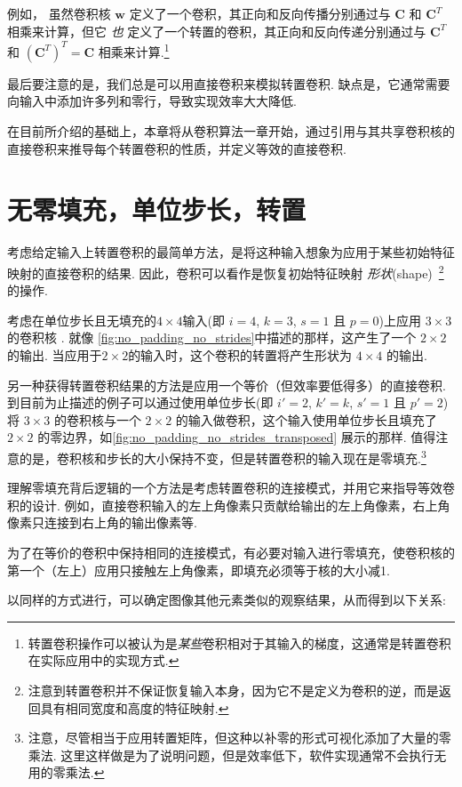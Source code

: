 \documentclass[notitlepage]{ctexrep}
\begin{document}
例如， 虽然卷积核 $\mathbf{w}$ 定义了一个卷积，其正向和反向传播分别通过与 $\mathbf{C}$ 和 $\mathbf{C}^T$ 相乘来计算，但它 {\em 也} 定义了一个转置的卷积，其正向和反向传递分别通过与 $\mathbf{C}^T$ 和 $(\mathbf{C}^T)^T = \mathbf{C}$ 相乘来计算.\footnote{转置卷积操作可以被认为是{\em 某些}卷积相对于其输入的梯度，这通常是转置卷积在实际应用中的实现方式.}

最后要注意的是，我们总是可以用直接卷积来模拟转置卷积. 缺点是，它通常需要向输入中添加许多列和零行，导致实现效率大大降低.

在目前所介绍的基础上，本章将从卷积算法一章开始，通过引用与其共享卷积核的直接卷积来推导每个转置卷积的性质，并定义等效的直接卷积.

\section{无零填充，单位步长，转置}

考虑给定输入上转置卷积的最简单方法，是将这种输入想象为应用于某些初始特征映射的直接卷积的结果. 因此，卷积可以看作是恢复初始特征映射 \emph{形状}(shape)~\footnote{注意到转置卷积并不保证恢复输入本身，因为它不是定义为卷积的逆，而是返回具有相同宽度和高度的特征映射.} 的操作.

考虑在单位步长且无填充的$4 \times 4$输入(即 $i = 4$, $k = 3$, $s = 1$ 且 $p = 0$)上应用 $3 \times 3$ 的卷积核 . 就像 \autoref{fig:no_padding_no_strides}中描述的那样，这产生了一个 $2 \times 2$ 的输出. 当应用于$2 \times 2$的输入时，这个卷积的转置将产生形状为 $4 \times 4$ 的输出.

另一种获得转置卷积结果的方法是应用一个等价（但效率要低得多）的直接卷积. 到目前为止描述的例子可以通过使用单位步长(即 $i' = 2$, $k' = k$, $s' = 1$ 且 $p' = 2$)将 $3 \times 3$ 的卷积核与一个 $2 \times 2$ 的输入做卷积，这个输入使用单位步长且填充了 $2 \times 2$ 的零边界，如\autoref{fig:no_padding_no_strides_transposed} 展示的那样. 值得注意的是，卷积核和步长的大小保持不变，但是转置卷积的输入现在是零填充.\footnote{注意，尽管相当于应用转置矩阵，但这种以补零的形式可视化添加了大量的零乘法. 这里这样做是为了说明问题，但是效率低下，软件实现通常不会执行无用的零乘法.}

理解零填充背后逻辑的一个方法是考虑转置卷积的连接模式，并用它来指导等效卷积的设计. 例如，直接卷积输入的左上角像素只贡献给输出的左上角像素，右上角像素只连接到右上角的输出像素等.

为了在等价的卷积中保持相同的连接模式，有必要对输入进行零填充，使卷积核的第一个（左上）应用只接触左上角像素，即填充必须等于核的大小减1.

以同样的方式进行，可以确定图像其他元素类似的观察结果，从而得到以下关系:
\end{document}
